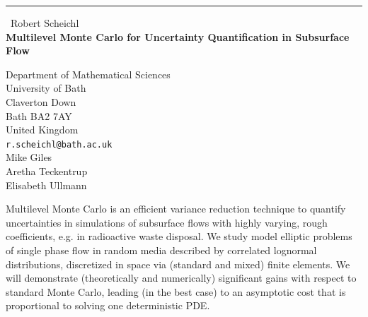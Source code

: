 \documentclass{report}
\begin{document}
\begin{center}
\rule{6in}{1pt} \
{\large Robert Scheichl \\
{\bf Multilevel Monte Carlo for Uncertainty Quantification in Subsurface Flow}}

Department of Mathematical Sciences \\ University of Bath \\ Claverton Down \\ Bath BA2 7AY \\ United Kingdom
\\
{\tt r.scheichl@bath.ac.uk}\\
Mike Giles\\
Aretha Teckentrup\\
Elisabeth Ullmann\end{center}

Multilevel Monte Carlo is an efficient variance reduction technique to
quantify uncertainties in simulations of subsurface flows with highly
varying, rough coefficients, e.g. in radioactive waste disposal. We study
model elliptic problems of single phase flow in random media described by
correlated lognormal distributions, discretized in space via (standard
and mixed) finite elements. We will demonstrate (theoretically and
numerically) significant gains with respect to standard Monte Carlo,
leading (in the best case) to an asymptotic cost that is proportional to
solving one deterministic PDE.
\end{document}
